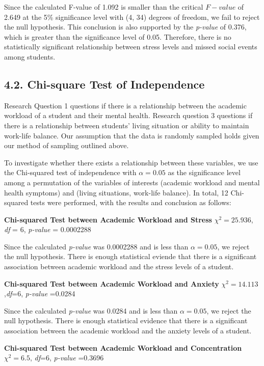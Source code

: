 \documentclass[
  letterpaper,
  DIV=11,
  numbers=noendperiod]{scrartcl}
\begin{document}
Since the calculated F-value of 1.092 is smaller than the critical
\(F-value\) of 2.649 at the 5\% significance level with (4, 34) degrees
of freedom, we fail to reject the null hypothesis. This conclusion is
also supported by the \emph{p-value} of 0.376, which is greater than the
significance level of 0.05. Therefore, there is no statistically
significant relationship between stress levels and missed social events
among students.

\subsection{4.2. Chi-square Test of
Independence}\label{chi-square-test-of-independence}

Research Question 1 questions if there is a relationship between the
academic workload of a student and their mental health. Research
question 3 questions if there is a relationship between students' living
situation or ability to maintain work-life balance. Our assumption that
the data is randomly sampled holds given our method of sampling outlined
above.

To investigate whether there exists a relationship between these
variables, we use the Chi-squared test of independence with
\(\alpha = 0.05\) as the significance level among a permutation of the
variables of interests (academic workload and mental health symptoms)
and (living situations, work-life balance). In total, 12 Chi-squared
tests were performed, with the results and conclusion as follows:

\textbf{Chi-squared Test between Academic Workload and Stress}
\(\chi^2 = 25.936\), \emph{df} = 6, \emph{p-value} = 0.0002288

Since the calculated \emph{p-value} was 0.0002288 and is less than
\(\alpha = 0.05\), we reject the null hypothesis. There is enough
statistical eviende that there is a significant association between
academic workload and the stress levels of a student.

\textbf{Chi-squared Test between Academic Workload and Anxiety}
\(\chi^2 =14.113\),\emph{df}=6, \emph{p-value} =0.0284

Since the calculated \emph{p-value} was 0.0284 and is less than
\(\alpha = 0.05\), we reject the null hypothesis. There is enough
statistical evidence that there is a significant association between the
academic workload and the anxiety levels of a student.

\textbf{Chi-squared Test between Academic Workload and Concentration}
\(\chi^2 =6.5\), \emph{df}=6, \emph{p-value} =0.3696
\end{document}
